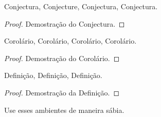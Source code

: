 \begin{con}
  Conjectura, Conjecture, Conjectura, Conjectura.
\end{con}
\begin{proof}
  Demostração do Conjectura.
\end{proof}

\begin{cor}
  Corolário, Corolário, Corolário, Corolário.
\end{cor}
\begin{proof}
  Demostração do Corolário.
\end{proof}

\begin{dfn}
  Definição, Definição, Definição.
\end{dfn}
\begin{proof}
  Demostração da Definição.
\end{proof}

Use esses ambientes de maneira sábia.
